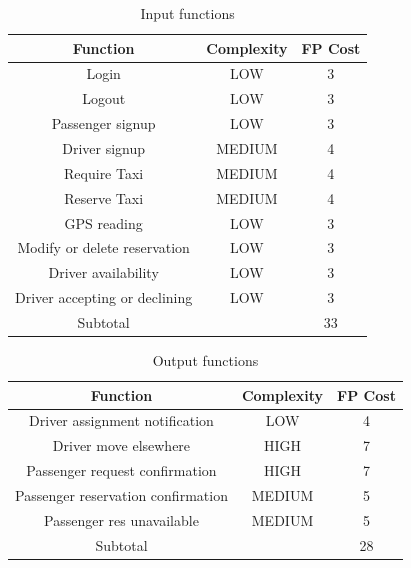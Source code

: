 \begin{table}
\begin{center}
\begin{tabular}{ccc}
\toprule
Function                        & Complexity   & FP Cost \\
\midrule
Login                           &   LOW   &   3   \\
Logout                        &   LOW   &   3   \\
Passenger signup               &   LOW   &   3   \\
Driver signup                  &   MEDIUM   &   4   \\
Require Taxi                  &   MEDIUM   &   4   \\
Reserve Taxi                  &   MEDIUM   &   4   \\
GPS reading                     &   LOW   &   3   \\
Modify or delete reservation   &   LOW   &   3   \\
Driver availability            &   LOW   &   3   \\
Driver accepting or declining   &   LOW   &   3   \\
\midrule
Subtotal                        &         &   33   \\
\bottomrule
\end{tabular}
\caption{Input functions}
\end{center}
\end{table}


\begin{table}
\begin{center}
\begin{tabular}{ccc}
\toprule
Function                        & Complexity   & FP Cost \\
\midrule
Driver assignment notification   &   LOW   &   4   \\
Driver move elsewhere         &   HIGH   &   7   \\
Passenger request confirmation   &   HIGH   &   7   \\
Passenger reservation confirmation   &   MEDIUM   &   5   \\
Passenger res unavailable      &   MEDIUM   &   5   \\
\midrule
Subtotal                        &         &   28   \\
\bottomrule
\end{tabular}
\caption{Output functions}
\end{center}
\end{table}

